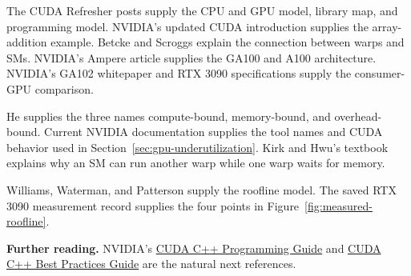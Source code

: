 \documentclass[11pt]{article}
\numberwithin{equation}{section}
\numberwithin{figure}{section}
\numberwithin{table}{section}
\begin{document}
The CUDA Refresher posts supply the CPU and GPU model, library map, and programming
model.  NVIDIA's updated CUDA introduction supplies the array-addition example.
Betcke and Scroggs explain the connection between warps and SMs.  NVIDIA's Ampere
article supplies the GA100 and A100 architecture.  NVIDIA's GA102 whitepaper and
RTX 3090 specifications supply the consumer-GPU comparison.

He supplies the three names compute-bound, memory-bound, and overhead-bound.
Current NVIDIA documentation supplies the tool names and CUDA behavior used in
Section~\ref{sec:gpu-underutilization}.  Kirk and Hwu's textbook explains why an SM
can run another warp while one warp waits for memory.

Williams, Waterman, and Patterson supply the roofline model.  The saved RTX 3090
measurement record supplies the four points in Figure~\ref{fig:measured-roofline}.

\textbf{Further reading.}
NVIDIA's \href{https://docs.nvidia.com/cuda/cuda-c-programming-guide/}%
{CUDA C++ Programming Guide} and
\href{https://docs.nvidia.com/cuda/cuda-c-best-practices-guide/}%
{CUDA C++ Best Practices Guide} are the natural next references.
\end{document}
